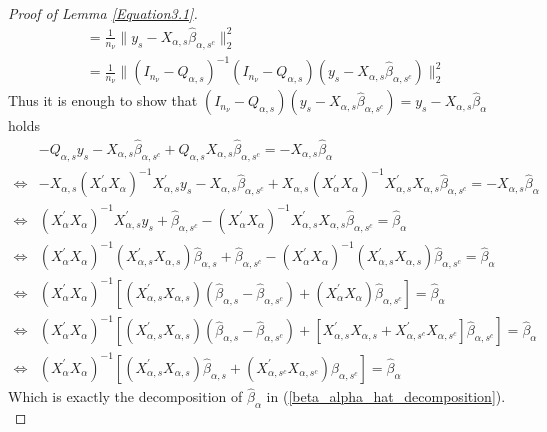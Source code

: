 \documentclass[Research_Module_ES.tex]{subfiles}
\begin{document}
\begin{proof}[Proof of Lemma \ref{Equation3.1}]
\begin{align*}
	&=\frac{1}{n_\nu}\parallel y_s-X_{\alpha,s}\hat{\beta}_{\alpha,s^c}\parallel_2^2\\
	&=\frac{1}{n_\nu}\parallel (I_{n_\nu}-Q_{\alpha,s})^{-1}(I_{n_\nu}-Q_{\alpha,s})(y_s-X_{\alpha,s}\hat{\beta}_{\alpha,s^c})\parallel_2^2
	\end{align*}
	Thus it is enough to show that $(I_{n_\nu}-Q_{\alpha,s})(y_s-X_{\alpha,s}\hat{\beta}_{\alpha,s^c})=y_s-X_{\alpha,s}\hat{\beta}_\alpha$ holds 
	\begin{align*}
		&-Q_{\alpha,s}y_s-X_{\alpha,s}\hat{\beta}_{\alpha,s^c}+Q_{\alpha,s}X_{\alpha,s}\hat{\beta}_{\alpha,s^c}=-X_{\alpha,s}\hat{\beta}_\alpha\\
		\Leftrightarrow&-X_{\alpha,s}(X_{\alpha}^\prime X_{\alpha})^{-1}X_{\alpha,s}^\prime y_s- X_{\alpha,s}\hat{\beta}_{\alpha,s^c}+X_{\alpha,s}(X_{\alpha}^\prime X_{\alpha})^{-1}X_{\alpha,s}^\prime X_{\alpha,s}\hat{\beta}_{\alpha,s^c}=-X_{\alpha,s}\hat{\beta}_{\alpha}\\
		\Leftrightarrow&(X_{\alpha}^\prime X_{\alpha})^{-1}X_{\alpha,s}^\prime y_s+ \hat{\beta}_{\alpha,s^c}-(X_{\alpha}^\prime X_{\alpha})^{-1}X_{\alpha,s}^\prime X_{\alpha,s}\hat{\beta}_{\alpha,s^c}=\hat{\beta}_{\alpha}\\
		\Leftrightarrow&(X_{\alpha}^\prime X_{\alpha})^{-1}(X_{\alpha,s}^\prime X_{\alpha,s})\hat{\beta}_{\alpha,s}+ \hat{\beta}_{\alpha,s^c}-(X_{\alpha}^\prime X_{\alpha})^{-1}(X_{\alpha,s}^\prime X_{\alpha,s})\hat{\beta}_{\alpha,s^c}=\hat{\beta}_{\alpha}\\
		\Leftrightarrow&(X_{\alpha}^\prime X_{\alpha})^{-1}[(X_{\alpha,s}^\prime X_{\alpha,s})(\hat{\beta}_{\alpha,s}-\hat{\beta}_{\alpha,s^c})+(X_{\alpha}^\prime X_{\alpha})\hat{\beta}_{\alpha,s^c}]=\hat{\beta}_{\alpha}\\
		\Leftrightarrow&(X_{\alpha}^\prime X_{\alpha})^{-1}[(X_{\alpha,s}^\prime X_{\alpha,s})(\hat{\beta}_{\alpha,s}-\hat{\beta}_{\alpha,s^c})+[X_{\alpha,s}^\prime X_{\alpha,s}+X_{\alpha,s^c}^\prime X_{\alpha,s^c}]\hat{\beta}_{\alpha,s^c}]=\hat{\beta}_{\alpha}\\
		\Leftrightarrow&(X_\alpha^\prime X_\alpha)^{-1}[(X_{\alpha,s}^\prime X_{\alpha,s}) \hat{\beta}_{\alpha,s}+(X_{\alpha,s^c}^\prime X_{\alpha,s^c})\hat{\beta}_{\alpha,s^c}]=\hat{\beta}_{\alpha}
	\end{align*}
Which is exactly the decomposition of $\hat{\beta}_{\alpha}$ in   (\ref{beta_alpha_hat_decomposition}).\\
\end{proof}
\end{document}

